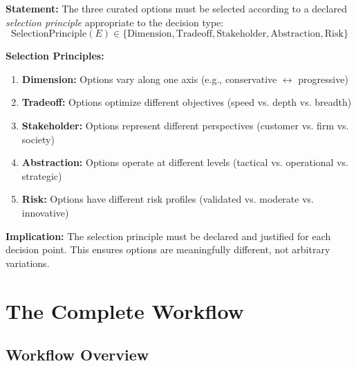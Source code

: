 \begin{tcolorbox}[colback=gray!5!white, colframe=gray!75!black,
    title=Axiom MD-4: Option Selection Principles]
\textbf{Statement:} The three curated options must be selected according to
a declared \textit{selection principle} appropriate to the decision type:
\begin{equation}
\text{SelectionPrinciple}(E) \in \{\text{Dimension}, \text{Tradeoff}, \text{Stakeholder}, \text{Abstraction}, \text{Risk}\}
\end{equation}

\textbf{Selection Principles:}
\begin{enumerate}[nosep]
\item \textbf{Dimension:} Options vary along one axis (e.g., conservative $\leftrightarrow$ progressive)
\item \textbf{Tradeoff:} Options optimize different objectives (speed vs. depth vs. breadth)
\item \textbf{Stakeholder:} Options represent different perspectives (customer vs. firm vs. society)
\item \textbf{Abstraction:} Options operate at different levels (tactical vs. operational vs. strategic)
\item \textbf{Risk:} Options have different risk profiles (validated vs. moderate vs. innovative)
\end{enumerate}

\textbf{Implication:} The selection principle must be declared and justified
for each decision point. This ensures options are meaningfully different,
not arbitrary variations.
\end{tcolorbox}


\section{The Complete Workflow}
\label{sec:eee-workflow}

\subsection{Workflow Overview}


